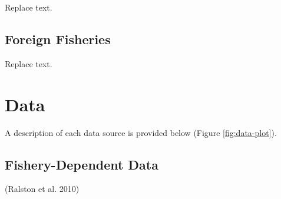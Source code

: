 \documentclass[11pt,
  english,
  a4paper,
]{article}
\begin{document}
\leavevmode\tagmcend\tagstructend


Replace text.

\leavevmode\tagmcend\tagstructend\par


\hypertarget{foreign-fisheries-1}{%
\subsection{Foreign Fisheries}\label{foreign-fisheries-1}}

\leavevmode\tagmcend\tagstructend


Replace text.

\leavevmode\tagmcend\tagstructend\par


\hypertarget{data}{%
\section{Data}\label{data}}

\leavevmode\tagmcend\tagstructend


A description of each data source is provided below (Figure \ref{fig:data-plot}).

\leavevmode\tagmcend\tagstructend\par


\hypertarget{fishery-dependent-data}{%
\subsection{Fishery-Dependent Data}\label{fishery-dependent-data}}

\leavevmode\tagmcend\tagstructend


{(Ralston et al. 2010)\leavevmode\tagmcend\tagstructend}

\leavevmode\tagmcend\tagstructend\par

\end{document}

